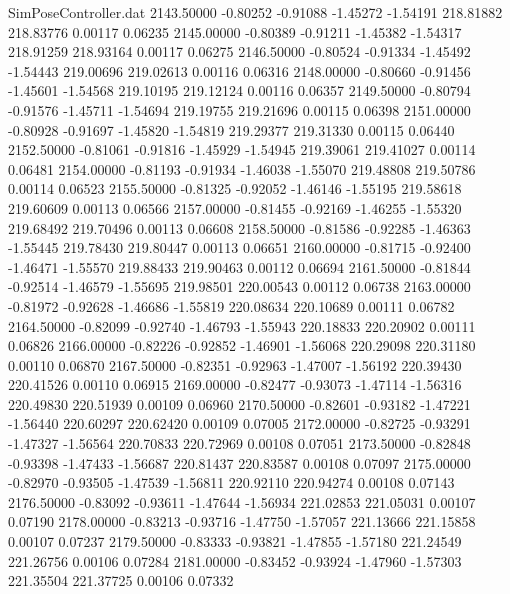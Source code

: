 \begin{filecontents}{SimPoseController.dat}
2143.50000   -0.80252   -0.91088    -1.45272   -1.54191  218.81882  218.83776    0.00117    0.06235
2145.00000   -0.80389   -0.91211    -1.45382   -1.54317  218.91259  218.93164    0.00117    0.06275
2146.50000   -0.80524   -0.91334    -1.45492   -1.54443  219.00696  219.02613    0.00116    0.06316
2148.00000   -0.80660   -0.91456    -1.45601   -1.54568  219.10195  219.12124    0.00116    0.06357
2149.50000   -0.80794   -0.91576    -1.45711   -1.54694  219.19755  219.21696    0.00115    0.06398
2151.00000   -0.80928   -0.91697    -1.45820   -1.54819  219.29377  219.31330    0.00115    0.06440
2152.50000   -0.81061   -0.91816    -1.45929   -1.54945  219.39061  219.41027    0.00114    0.06481
2154.00000   -0.81193   -0.91934    -1.46038   -1.55070  219.48808  219.50786    0.00114    0.06523
2155.50000   -0.81325   -0.92052    -1.46146   -1.55195  219.58618  219.60609    0.00113    0.06566
2157.00000   -0.81455   -0.92169    -1.46255   -1.55320  219.68492  219.70496    0.00113    0.06608
2158.50000   -0.81586   -0.92285    -1.46363   -1.55445  219.78430  219.80447    0.00113    0.06651
2160.00000   -0.81715   -0.92400    -1.46471   -1.55570  219.88433  219.90463    0.00112    0.06694
2161.50000   -0.81844   -0.92514    -1.46579   -1.55695  219.98501  220.00543    0.00112    0.06738
2163.00000   -0.81972   -0.92628    -1.46686   -1.55819  220.08634  220.10689    0.00111    0.06782
2164.50000   -0.82099   -0.92740    -1.46793   -1.55943  220.18833  220.20902    0.00111    0.06826
2166.00000   -0.82226   -0.92852    -1.46901   -1.56068  220.29098  220.31180    0.00110    0.06870
2167.50000   -0.82351   -0.92963    -1.47007   -1.56192  220.39430  220.41526    0.00110    0.06915
2169.00000   -0.82477   -0.93073    -1.47114   -1.56316  220.49830  220.51939    0.00109    0.06960
2170.50000   -0.82601   -0.93182    -1.47221   -1.56440  220.60297  220.62420    0.00109    0.07005
2172.00000   -0.82725   -0.93291    -1.47327   -1.56564  220.70833  220.72969    0.00108    0.07051
2173.50000   -0.82848   -0.93398    -1.47433   -1.56687  220.81437  220.83587    0.00108    0.07097
2175.00000   -0.82970   -0.93505    -1.47539   -1.56811  220.92110  220.94274    0.00108    0.07143
2176.50000   -0.83092   -0.93611    -1.47644   -1.56934  221.02853  221.05031    0.00107    0.07190
2178.00000   -0.83213   -0.93716    -1.47750   -1.57057  221.13666  221.15858    0.00107    0.07237
2179.50000   -0.83333   -0.93821    -1.47855   -1.57180  221.24549  221.26756    0.00106    0.07284
2181.00000   -0.83452   -0.93924    -1.47960   -1.57303  221.35504  221.37725    0.00106    0.07332

\end{filecontents}
